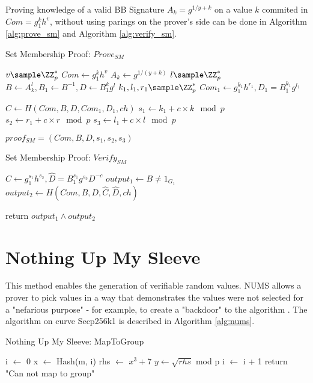 Proving knowledge of a valid BB Signature $A_k = g^{1/{y+k}}$ on a value $k$ commited in $Com = g_1^k h^v$, without using parings on the prover's side can be done in Algorithm \ref{alg:prove_sm} and Algorithm \ref{alg:verify_sm}. 

\begin{algorithm}
 \caption{Set Membership Proof: $Prove_{SM}$}
    \label{alg:prove_sm}
    \LinesNumbered
    
    
    $v \sample \ZZ_p^*$\;
    $Com \gets g_1^k h^v$ \;
    $A_k \gets g^{1/(y+k)}$ \;
    $l \sample \ZZ_p^*$ \;
    $B \gets A_k^l, B_1 \gets B^{-1}, D \gets B_1^kg^l$ \;
    $k_1, l_1, r_1 \sample \ZZ_p^*$ \;
    $Com_1 \gets g_1^{k_1}h^{r_1}, D_1 = B_1^{k_1} g^{l_1}$ \;
    
    $C \gets H(Com, B, D, Com_1, D_1, ch)$ \;
    $s_1 \gets k_1 + c \times k \mod p$ \;
    $s_2 \gets r_1 + c \times r \mod p$ \;
    $s_3 \gets l_1 + c \times l \mod p$ \;
    
    $proof_{SM} = (Com, B, D, s_1, s_2, s_3)$
\end{algorithm}

\begin{algorithm}
 \caption{Set Membership Proof: $Verify_{SM}$}
    \label{alg:verify_sm}
    \LinesNumbered
    
    
    $\hat{C} \gets g_1^{s_1}h^{s_2}, \hat{D} = B_1^{s_1}g^{s_3}D^{-c}$ \;
    $output_1 \gets B \neq 1_{G_1}$ \;
    $output_2 \gets H(Com, B, D, \hat{C}, \hat{D}, ch)$ \;
    
    return $output_1 \land output_2$
\end{algorithm}

\section{Nothing Up My Sleeve}
\label{appendex:NUMS}
This method enables the generation of verifiable random values. NUMS allows a prover to pick values in a way that demonstrates the values were not selected for a "nefarious purpose" - for example, to create a "backdoor" to the algorithm \cite{black2014elliptic}. The algorithm on curve Secp256k1 is described in Algorithm \ref{alg:nums}.

\begin{algorithm}
 \caption{Nothing Up My Sleeve: MapToGroup}
    \label{alg:nums}
    \LinesNumbered
    
    i $\gets$ 0 \;
     {
        x $\gets$ Hash(m, i) \;
        rhs $\gets$ $x^3 + 7$ \;
         {
            $y \gets \sqrt{rhs}$ mod p \;
        }
        i $\gets$ i + 1\;
    }
    return "Can not map to group"\;
\end{algorithm}
